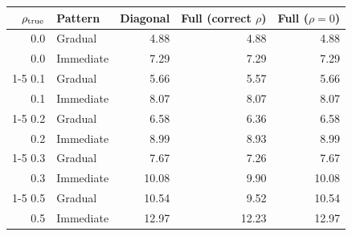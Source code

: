 \begin{tabular}{r l rrr}
\toprule
$\rho_{\rm true}$ & Pattern & Diagonal & Full (correct $\rho$) & Full ($\rho{=}0$) \\
\midrule
0.0 & Gradual & 4.88 & 4.88 & 4.88 \\
0.0 & Immediate & 7.29 & 7.29 & 7.29 \\
\cmidrule(lr){1-5}
0.1 & Gradual & 5.66 & 5.57 & 5.66 \\
0.1 & Immediate & 8.07 & 8.07 & 8.07 \\
\cmidrule(lr){1-5}
0.2 & Gradual & 6.58 & 6.36 & 6.58 \\
0.2 & Immediate & 8.99 & 8.93 & 8.99 \\
\cmidrule(lr){1-5}
0.3 & Gradual & 7.67 & 7.26 & 7.67 \\
0.3 & Immediate & 10.08 & 9.90 & 10.08 \\
\cmidrule(lr){1-5}
0.5 & Gradual & 10.54 & 9.52 & 10.54 \\
0.5 & Immediate & 12.97 & 12.23 & 12.97 \\
\bottomrule
\end{tabular}
